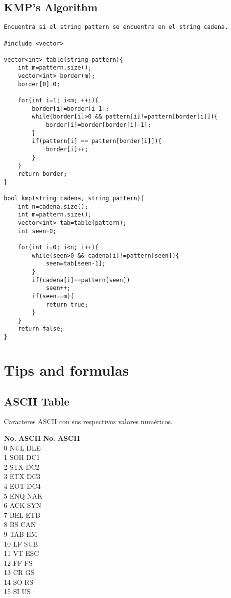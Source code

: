 \documentclass[10pt,letterpaper,twocolumn,twosided]{article}
\begin{document}
\subsection{KMP's Algorithm}
\begin{lstlisting}
Encuentra si el string pattern se encuentra en el string cadena.

#include <vector>

vector<int> table(string pattern){
	int m=pattern.size();
	vector<int> border(m);
	border[0]=0;

	for(int i=1; i<m; ++i){
		border[i]=border[i-1];
		while(border[i]>0 && pattern[i]!=pattern[border[i]]){
			border[i]=border[border[i]-1];
		}
		if(pattern[i] == pattern[border[i]]){
			border[i]++;
		}
	}
	return border;
}

bool kmp(string cadena, string pattern){
	int n=cadena.size();
	int m=pattern.size();
	vector<int> tab=table(pattern);
	int seen=0;

	for(int i=0; i<n; i++){
		while(seen>0 && cadena[i]!=pattern[seen]){
			seen=tab[seen-1];
		}
		if(cadena[i]==pattern[seen])
			seen++;
		if(seen==m){
			return true;
		}
	}
	return false;
}
\end{lstlisting}

\section{Tips and formulas}

\subsection{ASCII Table}
Caracteres ASCII con sus respectivos valores numéricos.


\begin{tabbing}
\textbf{No.}\hspace{1cm} \=  \textbf{ASCII}\hspace{2cm} \= \textbf{No.}\hspace{1cm} \= \textbf{ASCII}\hspace{2cm}  \\ 
0 \> NUL  \> DLE \\
1 \> SOH  \> DC1 \\
2 \> STX  \> DC2 \\
3 \> ETX  \> DC3 \\
4 \> EOT  \> DC4 \\
5 \> ENQ  \> NAK \\
6 \> ACK  \> SYN \\
7 \> BEL  \> ETB \\
8 \> BS  \> CAN \\
9 \> TAB  \> EM \\
10 \> LF  \> SUB \\
11 \> VT  \> ESC \\
12 \> FF  \> FS \\
13 \> CR  \> GS \\
14 \> SO  \> RS \\
15 \> SI  \> US \\ 
\end{tabbing}
\end{document}
